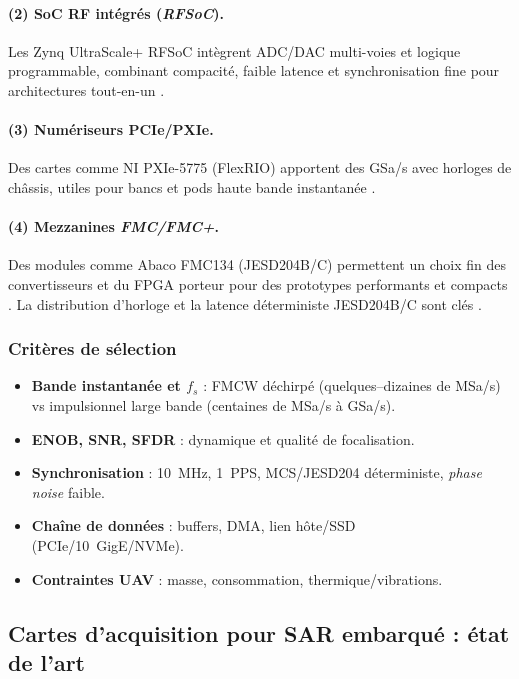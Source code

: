\paragraph{(2) SoC RF intégrés (\textit{RFSoC}).}
Les Zynq UltraScale+ RFSoC intègrent ADC/DAC multi-voies et logique programmable, combinant compacité, faible latence et synchronisation fine pour architectures tout-en-un \cite{AMD_RFSoC_DS889}.

\paragraph{(3) Numériseurs PCIe/PXIe.}
Des cartes comme NI PXIe-5775 (FlexRIO) apportent des GSa/s avec horloges de châssis, utiles pour bancs et pods haute bande instantanée \cite{NI_PXIe5775_Spec}.

\paragraph{(4) Mezzanines \textit{FMC/FMC+}.}
Des modules comme Abaco FMC134 (JESD204B/C) permettent un choix fin des convertisseurs et du FPGA porteur pour des prototypes performants et compacts \cite{Abaco_FMC134}. La distribution d’horloge et la latence déterministe JESD204B/C sont clés \cite{ADI_JESD204B_Survival}.

\subsubsection*{Critères de sélection}
\begin{itemize}
  \item \textbf{Bande instantanée et $f_s$} : FMCW déchirpé (quelques--dizaines de MSa/s) vs impulsionnel large bande (centaines de MSa/s à GSa/s).
  \item \textbf{ENOB, SNR, SFDR} : dynamique et qualité de focalisation.
  \item \textbf{Synchronisation} : 10~MHz, 1~PPS, MCS/JESD204 déterministe, \textit{phase noise} faible.
  \item \textbf{Chaîne de données} : buffers, DMA, lien hôte/SSD (PCIe/10~GigE/NVMe).
  \item \textbf{Contraintes UAV} : masse, consommation, thermique/vibrations.
\end{itemize}

\subsection{Cartes d'acquisition pour SAR embarqué : état de l'art}

